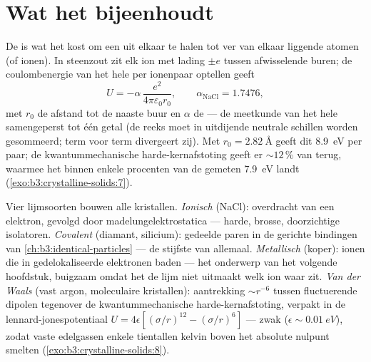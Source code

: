 \section{Wat het bijeenhoudt}

\begin{proposition}\label{prop:b3:crystalline-solids:madelung}
De \emph{} is wat het kost om een  uit elkaar te halen
tot ver van elkaar liggende atomen (of ionen). In steenzout zit elk ion met lading
$\pm e$ tussen afwisselende buren; de coulombenergie van het hele
 per ionenpaar optellen geeft
\[
U = -\alpha\,\frac{e^2}{4\pi\varepsilon_0 r_0} ,
\qquad \alpha_{\text{NaCl}} = 1.7476 ,
\]
met $r_0$ de afstand tot de naaste buur en $\alpha$ de
\emph{} --- de meetkunde van het hele 
samengeperst tot één getal (de reeks moet in uitdijende
neutrale schillen worden gesommeerd; term voor term divergeert zij). Met $r_0 =
\qty{2.82}{\angstrom}$ geeft dit \qty{8.9}{eV} per paar;
de kwantummechanische harde-kernafstoting geeft er $\sim12\,\%$ van terug, waarmee het binnen
enkele procenten van de gemeten \qty{7.9}{eV} landt
(\cref{exo:b3:crystalline-solids:7}).
\end{proposition}
\admitted

\begin{remark}\label{rem:b3:crystalline-solids:bonds}
Vier lijmsoorten bouwen alle kristallen. \emph{Ionisch} (NaCl): overdracht
van een elektron, gevolgd door madelungelektrostatica --- harde, brosse,
doorzichtige isolatoren. \emph{Covalent} (diamant, silicium): gedeelde
paren in de gerichte bindingen van
\cref{ch:b3:identical-particles} --- de stijfste van allemaal.
\emph{Metallisch} (koper): ionen die in gedelokaliseerde elektronen baden ---
het onderwerp van het volgende hoofdstuk, buigzaam omdat het de lijm niet uitmaakt
welk ion waar zit. \emph{Van der Waals} (vast argon, moleculaire
kristallen): aantrekking $\sim r^{-6}$ tussen fluctuerende dipolen tegenover
de kwantummechanische harde-kernafstoting, verpakt in de
lennard-jonespotentiaal $U = 4\epsilon[(\sigma/r)^{12} - (\sigma/r)^6]$ --- zwak
($\epsilon \sim \qty{0.01}{eV}$), zodat vaste edelgassen enkele
tientallen kelvin boven het absolute nulpunt smelten
(\cref{exo:b3:crystalline-solids:8}).
\end{remark}

